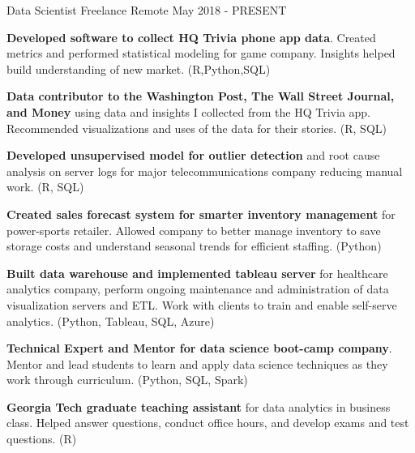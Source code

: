 

\begin{cventries}

  \cventry
    {Data Scientist} %
    {Freelance} %
    {Remote} %
    {May 2018 - PRESENT} %
    {
      \begin{cvitems} %
        \item {\textbf{Developed software to collect HQ Trivia phone app data}. Created metrics and performed statistical modeling for game company. Insights helped build understanding of new market. (R,Python,SQL)}
        \item {\textbf{Data contributor to the Washington Post, The Wall Street Journal, and Money} using data and insights I collected from the HQ Trivia app. Recommended visualizations and uses of the data for their stories. (R, SQL)}
        \item {\textbf{Developed unsupervised model for outlier detection} and root cause analysis on server logs for major telecommunications company reducing manual work. (R, SQL)}
        \item {\textbf{Created sales forecast system for smarter inventory management} for power-sports retailer. Allowed company to better manage inventory to save storage costs and understand seasonal trends for efficient staffing. (Python)}
        \item {\textbf{Built data warehouse and implemented tableau server} for healthcare analytics company, perform ongoing maintenance and administration of data visualization servers and ETL. Work with clients to train and enable self-serve analytics. (Python, Tableau, SQL, Azure)}
        \item {\textbf{Technical Expert and Mentor for data science boot-camp company}. Mentor and lead students to learn and apply data science techniques as they work through curriculum. (Python, SQL, Spark)}  
        \item {\textbf{Georgia Tech graduate teaching assistant} for data analytics in business class. Helped answer questions, conduct office hours, and develop exams and test questions. (R)} 
      \end{cvitems}
    }


\end{cventries}
